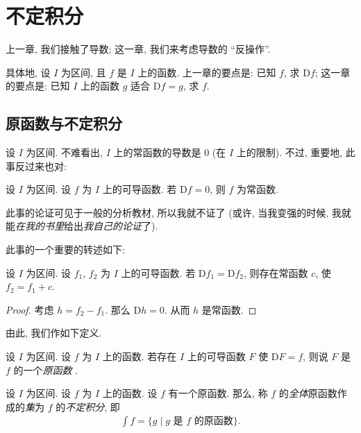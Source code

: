 \chapter{不定积分}

上一章, 我们接触了导数;
这一章, 我们来考虑导数的 ``反操作''.

具体地, 设 $I$ 为区间, 且 $f$ 是 $I$ 上的函数.
上一章的要点是:
已知 $f$, 求 $\mathrm{D}f$;
这一章的要点是:
已知 $I$ 上的函数 $g$ 适合 $\mathrm{D}f = g$, 求 $f$.

\section{原函数与不定积分}

设 $I$ 为区间.
不难看出, $I$ 上的常函数的导数是 $0$ (在 $I$ 上的限制).
不过, 重要地, 此事反过来也对:

\begin{theorem}
    设 $I$ 为区间.
    设 $f$ 为 $I$ 上的可导函数.
    若 $\mathrm{D}f = 0$, 则 $f$ 为常函数.
\end{theorem}

此事的论证可见于一般的分析教材, 所以我就不证了
(或许, 当我变强的时候,
我就能\emph{在我的书里}给出\emph{我自己的论证}了).

此事的一个重要的转述如下:

\begin{theorem}
    设 $I$ 为区间.
    设 $f_1$, $f_2$ 为 $I$ 上的可导函数.
    若 $\mathrm{D}{f_1} = \mathrm{D}{f_2}$,
    则存在常函数 $c$, 使 $f_2 = f_1 + c$.
\end{theorem}

\begin{proof}
    考虑 $h = f_2 - f_1$.
    那么 $\mathrm{D}h = 0$.
    从而 $h$ 是常函数.
\end{proof}

由此, 我们作如下定义.

\begin{definition}
    设 $I$ 为区间.
    设 $f$ 为 $I$ 上的函数.
    若存在 $I$ 上的可导函数 $F$ 使 $\mathrm{D}F = f$,
    则说 $F$ 是 $f$ 的一个\emph{原函数}%
    .
\end{definition}

\begin{definition}
    设 $I$ 为区间.
    设 $f$ 为 $I$ 上的函数.
    设 $f$ 有一个原函数.
    那么, 称 $f$ 的\emph{全体}原函数作成的\emph{集}为
    $f$ 的\emph{不定积分},
    即
    \begin{align*}
        \int {f} = \{ g \mid \text{$g$ 是 $f$ 的原函数} \}.
    \end{align*}
\end{definition}

